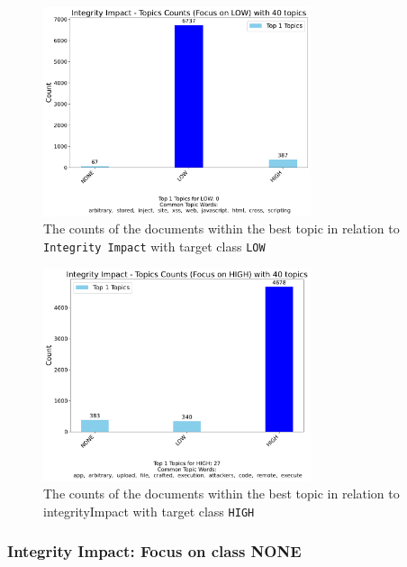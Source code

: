 \documentclass[12pt]{article}
\begin{document}
\begin{figure}[ht]
	\centering
	\includegraphics[width=0.7\textwidth]{figures/integrityImpact/merged_top_k_topics_category_focus_counts_integrityImpact_LOW_k1.pdf}
	\caption{The counts of the documents within the best topic in relation to \texttt{Integrity Impact} with target class \texttt{LOW}}
	\label{fig:integrityImpact_60_LOW}

\end{figure}

\begin{figure}[ht]
	\centering
	\includegraphics[width=0.7\textwidth]{figures/integrityImpact/merged_top_k_topics_category_focus_counts_integrityImpact_HIGH_k1.pdf}
	\caption{The counts of the documents within the best topic in relation to integrityImpact with target class \texttt{HIGH}}
	\label{fig:integrityImpact_60_HIGH}

\end{figure}

\subsubsection{Integrity Impact: Focus on class NONE}
\end{document}
